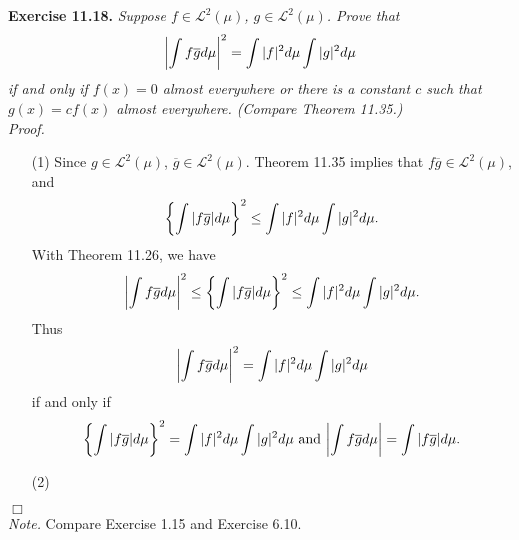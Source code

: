 \documentclass{article}
\begin{document}



\textbf{Exercise 11.18.}
\emph{Suppose $f \in \mathscr{L}^2(\mu)$, $g \in \mathscr{L}^2(\mu)$.
Prove that
\[
  \abs{ \int f\overline{g} d\mu }^2 = \int |f|^2 d\mu \int |g|^2 d\mu
\]
if and only if $f(x) = 0$ almost everywhere or there is a constant $c$ such that
$g(x) = cf(x)$ almost everywhere.
(Compare Theorem 11.35.)} \\



\emph{Proof.}
\begin{enumerate}
\item[(1)]
  Since $g \in \mathscr{L}^2(\mu)$, $\overline{g} \in \mathscr{L}^2(\mu)$.
  Theorem 11.35 implies that
  $f\overline{g} \in \mathscr{L}^2(\mu)$, and
  \[
    \left\{ \int \abs{ f\overline{g} } d\mu \right\}^2
    \leq \int |f|^2 d\mu \int |g|^2 d\mu.
  \]
  With Theorem 11.26, we have
  \[
    \abs{ \int f\overline{g} d\mu }^2
    \leq \left\{ \int \abs{ f\overline{g} } d\mu \right\}^2
    \leq \int |f|^2 d\mu \int |g|^2 d\mu.
  \]
  Thus
  \[
    \abs{ \int f\overline{g} d\mu }^2 = \int |f|^2 d\mu \int |g|^2 d\mu
  \]
  if and only if
  \[
    \left\{ \int \abs{ f\overline{g} } d\mu \right\}^2 = \int |f|^2 d\mu \int |g|^2 d\mu
    \text{ and }
    \abs{ \int f\overline{g} d\mu } = \int \abs{ f\overline{g} } d\mu.
  \]

\item[(2)]

\end{enumerate}
$\Box$ \\



\emph{Note.}
Compare Exercise 1.15 and Exercise 6.10. \\\\



\end{document}
